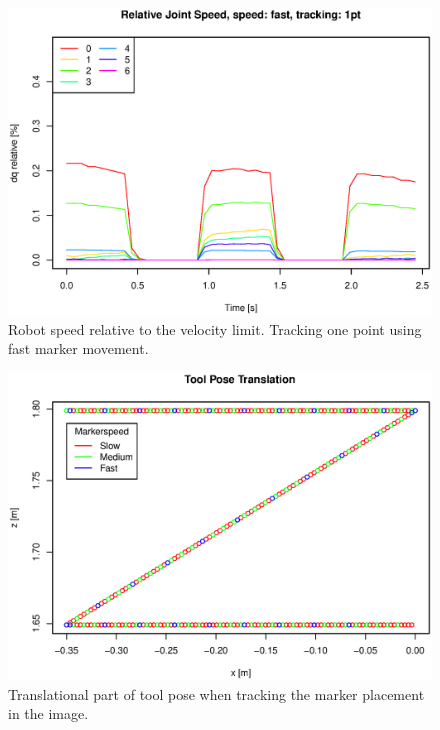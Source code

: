 \begin{figure}[H]
\centering
\includegraphics[width= \fullImageWidth]{graphics/robotics/relativeConfVel_fast_1pt}
\caption{Robot speed relative to the velocity limit. 
Tracking one point using fast marker movement.}
\label{fig:robotspeed_fast_1p}
\end{figure}

\begin{figure}[H]
\centering
\includegraphics[width= \fullImageWidth]{graphics/robotics/toolPose_1pt_pos}
\caption{Translational part of tool pose when tracking the marker placement in the image.}
\label{fig:toolpose_1p_pos}
\end{figure}

